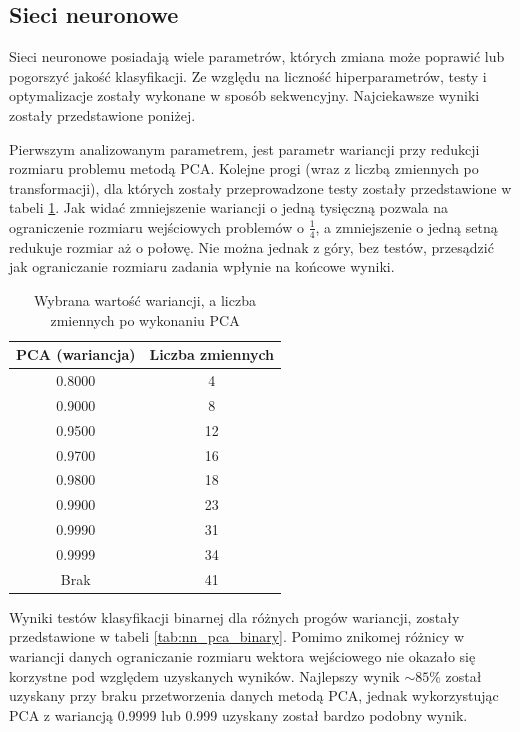 \documentclass[a4paper, twoside, 11pt, openright]{article}
\begin{document}
    

\subsection{Sieci neuronowe}

Sieci neuronowe posiadają wiele parametrów, których zmiana może poprawić lub pogorszyć jakość klasyfikacji. Ze względu na liczność hiperparametrów, testy i optymalizacje zostały wykonane w sposób sekwencyjny. Najciekawsze wyniki zostały przedstawione poniżej.

\bigskip

Pierwszym analizowanym parametrem, jest parametr wariancji przy redukcji rozmiaru problemu metodą PCA. Kolejne progi (wraz z liczbą zmiennych po transformacji), dla których zostały przeprowadzone testy zostały przedstawione w tabeli \ref{tab:pca_component_number}. Jak widać zmniejszenie wariancji o jedną tysięczną pozwala na ograniczenie rozmiaru wejściowych problemów o $\frac{1}{4}$, a zmniejszenie o jedną setną redukuje rozmiar aż o połowę. Nie można jednak z góry, bez testów, przesądzić jak ograniczanie rozmiaru zadania wpłynie na końcowe wyniki. 

\begin{table}[H]
    \centering
    \begin{tabular}{|c|c|}
    \hline
        \textbf{PCA (wariancja)} & \textbf{Liczba zmiennych} \\ \hline
        0.8000 & 4 \\ \hline 
        0.9000 & 8 \\ \hline 
        0.9500 & 12 \\ \hline 
        0.9700 & 16 \\ \hline 
        0.9800 & 18 \\ \hline 
        0.9900 & 23 \\ \hline
        0.9990 & 31 \\ \hline 
        0.9999 & 34 \\ \hline 
        Brak & 41 \\ \hline 
    \end{tabular}
    \caption{Wybrana wartość wariancji, a liczba zmiennych po wykonaniu PCA}
    \label{tab:pca_component_number}
\end{table}

Wyniki testów klasyfikacji binarnej dla różnych progów wariancji, zostały przedstawione w tabeli \ref{tab:nn_pca_binary}. Pomimo znikomej różnicy w wariancji danych ograniczanie rozmiaru wektora wejściowego nie okazało się korzystne pod względem uzyskanych wyników. Najlepszy wynik $\sim
85\%$ został uzyskany przy braku przetworzenia danych metodą PCA, jednak  wykorzystując PCA z wariancją 0.9999 lub 0.999 uzyskany został bardzo podobny wynik.
\end{document}
